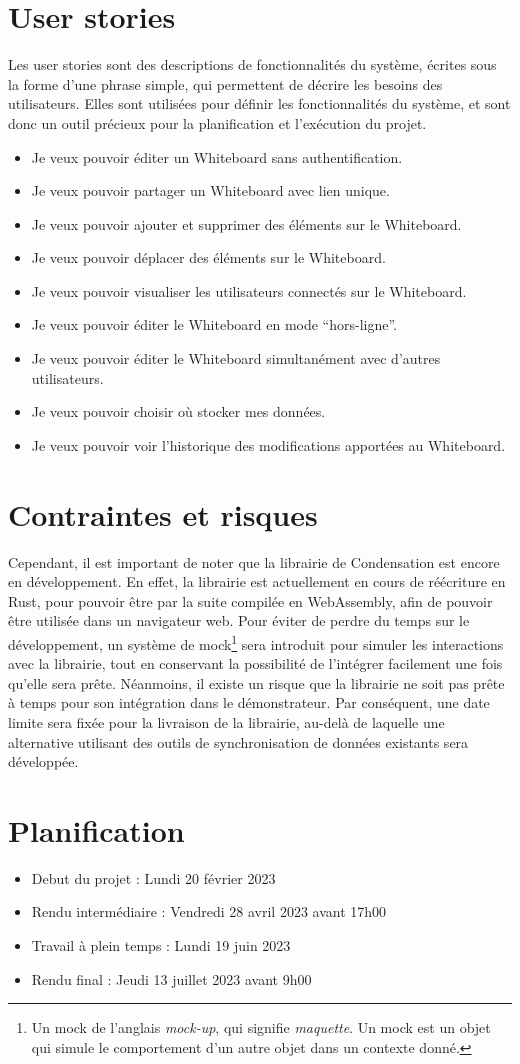 \section*{User stories \label{sec:user-stories}}
Les user stories sont des descriptions de fonctionnalités du système, écrites sous la forme d'une phrase simple, qui permettent de décrire les besoins des utilisateurs. Elles sont utilisées pour définir les fonctionnalités du système, et sont donc un outil précieux pour la planification et l'exécution du projet.
\begin{itemize}
    \item Je veux pouvoir éditer un Whiteboard sans authentification.
    \item Je veux pouvoir partager un Whiteboard avec lien unique.
    \item Je veux pouvoir ajouter et supprimer des éléments sur le Whiteboard.
    \item Je veux pouvoir déplacer des éléments sur le Whiteboard.
    \item Je veux pouvoir visualiser les utilisateurs connectés sur le Whiteboard.
    \item Je veux pouvoir éditer le Whiteboard en mode “hors-ligne”.
    \item Je veux pouvoir éditer le Whiteboard simultanément avec d'autres utilisateurs.
    \item Je veux pouvoir choisir où stocker mes données.
    \item Je veux pouvoir voir l'historique des modifications apportées au Whiteboard.
\end{itemize}

\section*{Contraintes et risques}
Cependant, il est important de noter que la librairie de Condensation est encore en développement. En effet, la librairie est actuellement en cours de réécriture en Rust, pour pouvoir être par la suite compilée en WebAssembly, afin de pouvoir être utilisée dans un navigateur web.
Pour éviter de perdre du temps sur le développement, un système de mock\footnote{Un mock de l'anglais \textit{mock-up}, qui signifie \textit{maquette}. Un mock est un objet qui simule le comportement d'un autre objet dans un contexte donné.} sera introduit pour simuler les interactions avec la librairie, tout en conservant la possibilité de l'intégrer facilement une fois qu'elle sera prête.
Néanmoins, il existe un risque que la librairie ne soit pas prête à temps pour son intégration dans le démonstrateur. Par conséquent, une date limite sera fixée pour la livraison de la librairie, au-delà de laquelle une alternative utilisant des outils de synchronisation de données existants sera développée.

\section*{Planification}

\begin{itemize}
    \item Debut du projet : Lundi 20 février 2023
    \item Rendu intermédiaire : Vendredi 28 avril 2023 avant 17h00
    \item Travail à plein temps : Lundi 19 juin 2023
    \item Rendu final : Jeudi 13 juillet 2023 avant 9h00
\end{itemize}
